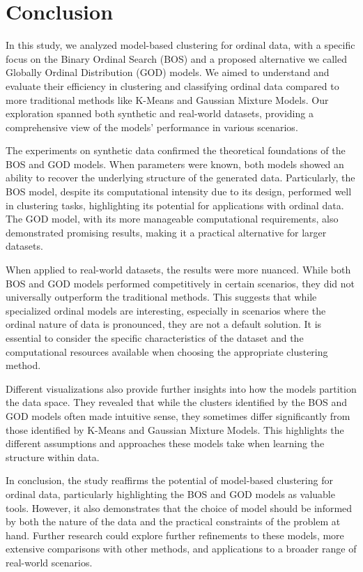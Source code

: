 \section{Conclusion}
In this study, we analyzed model-based clustering for ordinal data, with a specific focus on the Binary Ordinal Search (BOS) and a proposed alternative we called Globally Ordinal Distribution (GOD) models. We aimed to understand and evaluate their efficiency in clustering and classifying ordinal data compared to more traditional methods like K-Means and Gaussian Mixture Models. Our exploration spanned both synthetic and real-world datasets, providing a comprehensive view of the models' performance in various scenarios.

The experiments on synthetic data confirmed the theoretical foundations of the BOS and GOD models. When parameters were known, both models showed an ability to recover the underlying structure of the generated data. Particularly, the BOS model, despite its computational intensity due to its design, performed well in clustering tasks, highlighting its potential for applications with ordinal data. The GOD model, with its more manageable computational requirements, also demonstrated promising results, making it a practical alternative for larger datasets.

When applied to real-world datasets, the results were more nuanced. While both BOS and GOD models performed competitively in certain scenarios, they did not universally outperform the traditional methods. This suggests that while specialized ordinal models are interesting, especially in scenarios where the ordinal nature of data is pronounced, they are not a default solution. It is essential to consider the specific characteristics of the dataset and the computational resources available when choosing the appropriate clustering method.

Different visualizations also provide further insights into how the models partition the data space. They revealed that while the clusters identified by the BOS and GOD models often made intuitive sense, they sometimes differ significantly from those identified by K-Means and Gaussian Mixture Models. This highlights the different assumptions and approaches these models take when learning the structure within data.

In conclusion, the study reaffirms the potential of model-based clustering for ordinal data, particularly highlighting the BOS and GOD models as valuable tools. However, it also demonstrates that the choice of model should be informed by both the nature of the data and the practical constraints of the problem at hand. Further research could explore further refinements to these models, more extensive comparisons with other methods, and applications to a broader range of real-world scenarios.

